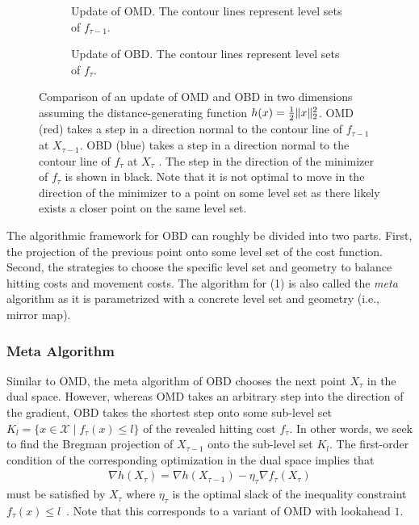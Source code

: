 \begin{figure}
    \begin{subfigure}[b]{\textwidth}
    \centering
    
    \caption{Update of OMD. The contour lines represent level sets of $f_{\tau-1}$.}
    \end{subfigure}
    \par\bigskip
    \begin{subfigure}[b]{\textwidth}
    \centering
    
    \caption{Update of OBD. The contour lines represent level sets of $f_{\tau}$.}
    \end{subfigure}
    \caption{Comparison of an update of OMD and OBD in two dimensions assuming the distance-generating function $h(x) = \frac{1}{2} \lVert x\rVert_2^2$. OMD (red) takes a step in a direction normal to the contour line of $f_{\tau-1}$ at $X_{\tau-1}$. OBD (blue) takes a step in a direction normal to the contour line of $f_{\tau}$ at $X_{\tau}$ \cite{Chen2018}. The step in the direction of the minimizer of $f_{\tau}$ is shown in black. Note that it is not optimal to move in the direction of the minimizer to a point on some level set as there likely exists a closer point on the same level set.}
    \label{fig:comparison_of_an_update_of_omd_and_obd}
\end{figure}

The algorithmic framework for OBD can roughly be divided into two parts. First, the projection of the previous point onto some level set of the cost function.  Second, the strategies to choose the specific level set and geometry to balance hitting costs and movement costs. The algorithm for (1) is also called the \emph{meta} algorithm as it is parametrized with a concrete level set and geometry (i.e., mirror map).

\subsubsection{Meta Algorithm}

Similar to OMD, the meta algorithm of OBD chooses the next point $X_{\tau}$ in the dual space. However, whereas OMD takes an arbitrary step into the direction of the gradient, OBD takes the shortest step onto some sub-level set $K_l = \{x \in \mathcal{X} \mid f_{\tau}(x) \leq l\}$ of the revealed hitting cost $f_{\tau}$. In other words, we seek to find the Bregman projection of $X_{\tau-1}$ onto the sub-level set $K_l$. The first-order condition of the corresponding optimization in the dual space implies that \begin{align}\label{eq:pbd:first_order_condition}
    \nabla h(X_{\tau}) = \nabla h(X_{\tau-1}) - \eta_{\tau} \nabla f_{\tau}(X_{\tau})
\end{align} must be satisfied by $X_{\tau}$ where $\eta_{\tau}$ is the optimal slack of the inequality constraint $f_{\tau}(x) \leq l$~\cite{Chen2018}. Note that this corresponds to a variant of OMD with lookahead $1$.

